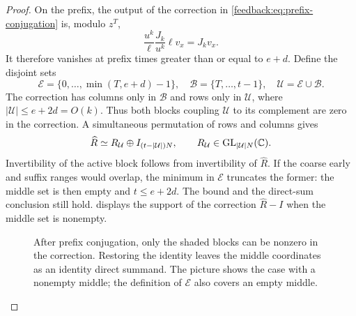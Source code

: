 \begin{proof}
On the prefix, the output of the correction in
\cref{feedback:eq:prefix-conjugation} is, modulo $z^T$,
\[
 \frac{u^k}{\ell}\frac{J_k}{u^k}\ell v_x=J_kv_x.
\]
It therefore vanishes at prefix times greater than or equal to $e+d$.
Define the disjoint sets
\[
 \mathcal E=\{0,\ldots,\min(T,e+d)-1\},\quad
 \mathcal B=\{T,\ldots,t-1\},\quad
 \mathcal U=\mathcal E\cup\mathcal B.
\]
The correction has columns only in $\mathcal B$ and rows only in
$\mathcal U$, where $|\mathcal U|\leq e+2d=O(k)$.
Thus both blocks coupling $\mathcal U$ to its complement are zero in
the correction.  A simultaneous permutation of rows and columns gives
\begin{equation}
 \widehat R\simeq R_{\mathcal U}\oplus
 I_{(t-|\mathcal U|)N},
 \qquad R_{\mathcal U}\in\operatorname{GL}_{|\mathcal U|N}(\mathbb C).
 \label{feedback:eq:active-summand}
\end{equation}
Invertibility of the active block follows from invertibility of
$\widehat R$.  If the coarse early and suffix ranges would overlap,
the minimum in $\mathcal E$ truncates the former: the middle set is
then empty and $t\leq e+2d$.  The bound and the direct-sum conclusion
still hold.   displays the support
of the correction $\widehat R-I$ when the middle set is nonempty.

\begin{figure}[t]
\centering
{}
\caption{After prefix conjugation, only the shaded blocks can be
nonzero in the correction.  Restoring the identity leaves the middle
coordinates as an identity direct summand.  The picture shows the case
with a nonempty middle; the definition of $\mathcal E$ also covers an
empty middle.}
\label{feedback:fig:boundary-support}
\end{figure}


\end{proof}
